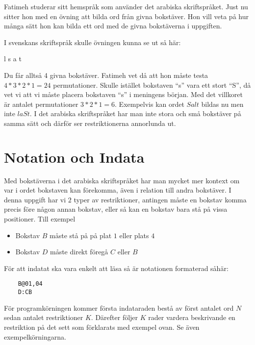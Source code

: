 
Fatimeh studerar sitt hemspråk som använder det arabiska skriftspråket. Just nu
sitter hon med en övning att bilda ord från givna bokstäver. Hon vill veta på
hur många sätt hon kan bilda ett ord med de givna bokstäverna i uppgiften.

I svenskans skriftspråk skulle övningen kunna se ut så här:

\vspace{0.2in}
\centerline{l s a t}
\vspace{0.2in}

Du får alltså 4 givna bokstäver. Fatimeh vet då att hon måste testa $4*3*2*1 =
24$ permutationer. Skulle istället bokstaven ``s'' vara ett stort ``S'', då vet vi
att vi måste placera bokstaven ``s'' i meningens början. Med det villkoret är
antalet permutationer $3*2*1 = 6$.  Exempelvis kan ordet $Salt$ bildas nu men
inte $laSt$. I det arabiska skriftspråket har man inte stora och små bokstäver
på samma sätt och därför ser restriktionerna annorlunda ut.

\section*{Notation och Indata}

Med bokstäverna i det arabiska skriftspråket har man mycket mer kontext om var
i ordet bokstaven kan förekomma, även i relation till andra bokstäver.  I denna
uppgift har vi $2$ typer av restriktioner, antingen måste en bokstav komma precis före
någon annan bokstav, eller så kan en bokstav bara stå på vissa positioner. Till
exempel

\begin{itemize}
    \item Bokstav $B$ måste stå på på plat $1$ eller plats $4$
    \item Bokstav $D$ måste direkt föregå $C$ eller $B$
\end{itemize}

För att indatat ska vara enkelt att läsa så är notationen formaterad såhär:

\begin{lstlisting}
    B@01,04
    D:CB
\end{lstlisting}

För programkörningen kommer första indataraden bestå av först antalet ord $N$
sedan antalet restriktioner $K$. Därefter följer $K$ rader vardera beskrivande
en restriktion på det sett som förklarats med exempel ovan. Se även
exempelkörningarna.

